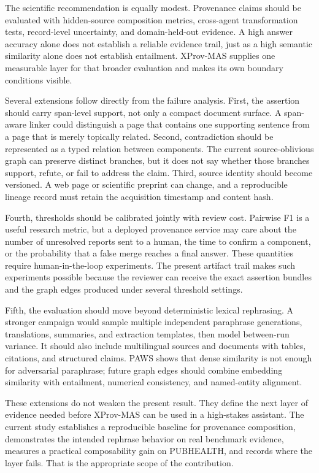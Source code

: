 \documentclass{ieeeaccess}
\begin{document}
The scientific recommendation is equally modest. Provenance claims should be evaluated with hidden-source composition metrics, cross-agent transformation tests, record-level uncertainty, and domain-held-out evidence. A high answer accuracy alone does not establish a reliable evidence trail, just as a high semantic similarity alone does not establish entailment. XProv-MAS supplies one measurable layer for that broader evaluation and makes its own boundary conditions visible.

Several extensions follow directly from the failure analysis. First, the assertion should carry span-level support, not only a compact document surface. A span-aware linker could distinguish a page that contains one supporting sentence from a page that is merely topically related. Second, contradiction should be represented as a typed relation between components. The current source-oblivious graph can preserve distinct branches, but it does not say whether those branches support, refute, or fail to address the claim. Third, source identity should become versioned. A web page or scientific preprint can change, and a reproducible lineage record must retain the acquisition timestamp and content hash.

Fourth, thresholds should be calibrated jointly with review cost. Pairwise F1 is a useful research metric, but a deployed provenance service may care about the number of unresolved reports sent to a human, the time to confirm a component, or the probability that a false merge reaches a final answer. These quantities require human-in-the-loop experiments. The present artifact trail makes such experiments possible because the reviewer can receive the exact assertion bundles and the graph edges produced under several threshold settings.

Fifth, the evaluation should move beyond deterministic lexical rephrasing. A stronger campaign would sample multiple independent paraphrase generations, translations, summaries, and extraction templates, then model between-run variance. It should also include multilingual sources and documents with tables, citations, and structured claims. PAWS shows that dense similarity is not enough for adversarial paraphrase; future graph edges should combine embedding similarity with entailment, numerical consistency, and named-entity alignment.

These extensions do not weaken the present result. They define the next layer of evidence needed before XProv-MAS can be used in a high-stakes assistant. The current study establishes a reproducible baseline for provenance composition, demonstrates the intended rephrase behavior on real benchmark evidence, measures a practical composability gain on PUBHEALTH, and records where the layer fails. That is the appropriate scope of the contribution.
\end{document}
